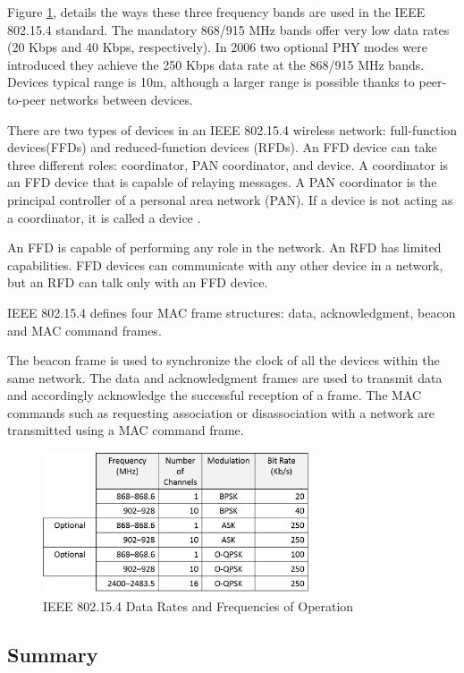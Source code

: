 Figure \ref{fig:802.15.4}, details the ways these three frequency bands are used in the IEEE 802.15.4 standard.
The mandatory 868/915 MHz bands offer very low data rates (20 Kbps and 40 Kbps, respectively). In 2006 two optional PHY modes were introduced they achieve the 250 Kbps data rate at the 868/915 MHz bands.
Devices typical range is 10m, although a larger range is possible thanks to peer-to-peer networks between devices.

There are two types of devices in an IEEE 802.15.4 wireless network: full-function devices(FFDs) and reduced-function devices (RFDs). An FFD device can take three different roles: coordinator, PAN coordinator, and device. A coordinator is an FFD device that is capable of relaying messages. A PAN coordinator is the principal controller of a personal area network
(PAN). If a device is not acting as a coordinator, it is called a device .

An FFD is capable of performing any role in the network. An RFD has limited capabilities. FFD devices can communicate with any other device in a network, but an RFD can talk only with an FFD device. 


IEEE 802.15.4 defines four MAC frame structures: data, acknowledgment, beacon and MAC command frames.

The beacon frame is used to synchronize the clock of all the devices within the same network. The data and acknowledgment frames are used to transmit data and accordingly acknowledge the successful reception of a frame. The MAC commands such as requesting association or disassociation with a network are transmitted using a MAC command frame.



\begin{figure}[h]
\centering
\includegraphics[width=0.7\textwidth]{Figures/802_15_4}
\caption{IEEE 802.15.4 Data Rates and Frequencies of Operation}
\label{fig:802.15.4}
\end{figure}


\subsection{Summary}\mbox{}\\

